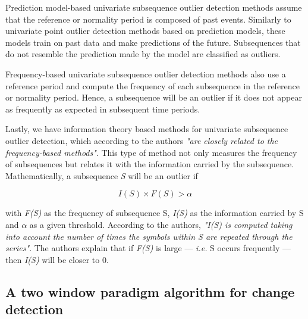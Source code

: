 Prediction model-based univariate subsequence outlier detection methods assume that the reference or normality period is composed of past events. Similarly to univariate point outlier detection methods based on prediction models, these models train on past data and make predictions of the future. Subsequences that do not resemble the prediction made by the model are classified as outliers.

Frequency-based univariate subsequence outlier detection methods also use a reference period and compute the frequency of each subsequence in the reference or normality period. Hence, a subsequence will be an outlier if it does not appear as frequently as expected in subsequent time periods.

Lastly, we have information theory based methods for univariate subsequence outlier detection, which according to the authors \textit{"are closely related to the frequency-based methods"}. This type of method not only measures the frequency of subsequences but relates it with the information carried by the subsequence. Mathematically, a subsequence \textit{S} will be an outlier if

\begin{equation*}
    I(S) \times F(S) > \alpha
\end{equation*}

with \textit{F(S)} as the frequency of subsequence S, \textit{I(S)} as the information carried by S and $\alpha$ as a given threshold. According to the authors, \textit{"I(S) is computed taking into account the number of times the symbols within S are repeated through the series"}. The authors explain that if \textit{F(S)} is large --- \textit{i.e.} S occurs frequently --- then \textit{I(S)} will be closer to 0.

\subsection{A two window paradigm algorithm for change detection}

